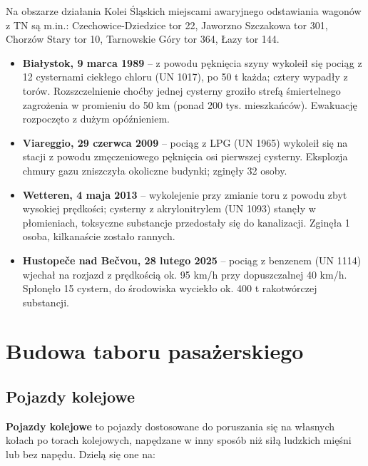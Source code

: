 Na obszarze działania Kolei Śląskich miejscami awaryjnego odstawiania wagonów z TN są m.in.: Czechowice-Dziedzice tor 22, Jaworzno Szczakowa tor 301, Chorzów Stary tor 10, Tarnowskie Góry tor 364, Łazy tor 144.

\begin{tcolorbox}[colback=yellow!10!white,colframe=orange!80!black,title=Dlaczego to ważne – przykłady zdarzeń]
	\begin{itemize}
		\item \textbf{Białystok, 9 marca 1989} – z powodu pęknięcia szyny wykoleił się pociąg z 12 cysternami ciekłego chloru (UN 1017), po 50 t każda; cztery wypadły z torów. Rozszczelnienie choćby jednej cysterny groziło strefą śmiertelnego zagrożenia w promieniu do 50 km (ponad 200 tys. mieszkańców). Ewakuację rozpoczęto z dużym opóźnieniem.
		\item \textbf{Viareggio, 29 czerwca 2009} – pociąg z LPG (UN 1965) wykoleił się na stacji z powodu zmęczeniowego pęknięcia osi pierwszej cysterny. Eksplozja chmury gazu zniszczyła okoliczne budynki; zginęły 32 osoby.
		\item \textbf{Wetteren, 4 maja 2013} – wykolejenie przy zmianie toru z powodu zbyt wysokiej prędkości; cysterny z akrylonitrylem (UN 1093) stanęły w płomieniach, toksyczne substancje przedostały się do kanalizacji. Zginęła 1 osoba, kilkanaście zostało rannych.
		\item \textbf{Hustopeče nad Bečvou, 28 lutego 2025} – pociąg z benzenem (UN 1114) wjechał na rozjazd z prędkością ok. 95 km/h przy dopuszczalnej 40 km/h. Spłonęło 15 cystern, do środowiska wyciekło ok. 400 t rakotwórczej substancji.
	\end{itemize}
\end{tcolorbox}

\chapter{Budowa taboru pasażerskiego}

\section{Pojazdy kolejowe}

\textbf{Pojazdy kolejowe} to pojazdy dostosowane do poruszania się na własnych kołach po torach kolejowych, napędzane w inny sposób niż siłą ludzkich mięśni lub bez napędu. Dzielą się one na:

